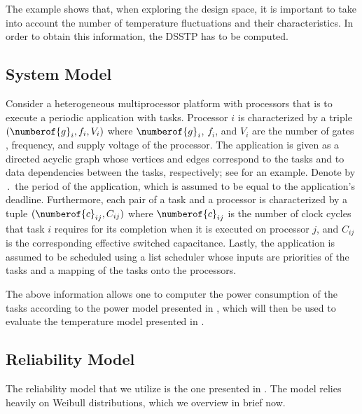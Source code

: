 The example shows that, when exploring the design space, it is important to
take into account the number of temperature fluctuations and their
characteristics. In order to obtain this information, the \ac{DSSTP} has to be
computed.

\subsection{System Model}

Consider a heterogeneous multiprocessor platform with \np processors that is to
execute a periodic application with \nt tasks. Processor $i$ is characterized by
a triple $(\numberof{g}_i, f_i, V_i)$ where $\numberof{g}_i$, $f_i$, and $V_i$
are the number of gates \cite{liao2005}, frequency, and supply voltage of the
processor. The application is given as a directed acyclic graph whose vertices
and edges correspond to the tasks and to data dependencies between the tasks,
respectively; see  for an example. Denote by
$\period$ the period of the application, which is assumed to be equal to the
application's deadline. Furthermore, each pair of a task and a processor is
characterized by a tuple $(\numberof{c}_{ij}, C_{ij})$ where $\numberof{c}_{ij}$
is the number of clock cycles that task $i$ requires for its completion when it
is executed on processor $j$, and $C_{ij}$ is the corresponding effective
switched capacitance. Lastly, the application is assumed to be scheduled using a
list scheduler whose inputs are priorities of the tasks and a mapping of the
tasks onto the processors.

The above information allows one to computer the power consumption of the tasks
according to the power model presented in , which will then be
used to evaluate the temperature model presented in .

\subsection{Reliability Model}
\newcommand{\mean}{\mu}
\newcommand{\scale}{\eta}
\newcommand{\shape}{\beta}

The reliability model that we utilize is the one presented in \cite{huang2009,
xiang2010}. The model relies heavily on Weibull distributions, which we overview
in brief now.

